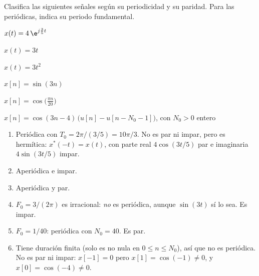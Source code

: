 \documentclass[11pt,a4paper]{scrartcl}
\begin{document}
\begin{ejercicio}
  Clasifica las siguientes señales según su periodicidad y su paridad. Para las periódicas, indica su periodo fundamental.
  \begin{incisos}[3]
    \item $x(t)=4\,\e^{j\frac35t}$
    \item $x(t)=3t$
    \item $x(t)=3t^2$
    \item $x[n]=\sin(3n)$
    \item $x[n]=\cos\big(\tfrac{\pi n}{20}\big)$
    \item $x[n]=\cos(3n-4)\,\big(u[n]-u[n-N_0-1]\big)$, con $N_0>0$ entero
  \end{incisos}
\end{ejercicio}
\begin{solucion}
  \begin{enumerate}[label=\alph*)]
    \item Periódica con $T_0=2\pi/(3/5)=10\pi/3$. No es par ni impar, pero es hermítica: $x^*(-t)=x(t)$, con parte real $4\cos(3t/5)$ par e imaginaria $4\sin(3t/5)$ impar.
    \item Aperiódica e impar.
    \item Aperiódica y par.
    \item $F_0=3/(2\pi)$ es irracional: \emph{no} es periódica, aunque $\sin(3t)$ sí lo sea. Es impar.
    \item $F_0=1/40$: periódica con $N_0=40$. Es par.
    \item Tiene duración finita (solo es no nula en $0\le n\le N_0$), así que no es periódica. No es par ni impar: $x[-1]=0$ pero $x[1]=\cos(-1)\ne0$, y $x[0]=\cos(-4)\ne0$.
  \end{enumerate}
\end{solucion}
\end{document}
